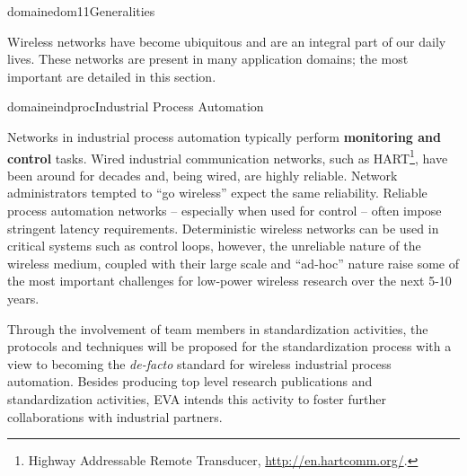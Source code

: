 \documentclass{ra2016}
\begin{document}

\begin{module}{domaine}{dom11}{Generalities}

Wireless networks have become ubiquitous and are an integral part of our daily lives.
These networks are present in many application domains; the most important are detailed in this section.

\end{module}

\begin{module}{domaine}{indproc}{Industrial Process Automation}

Networks in industrial process automation typically perform \textbf{monitoring and control} tasks.
Wired industrial communication networks, such as HART\footnote{Highway Addressable Remote Transducer, \url{http://en.hartcomm.org/}.}, have been around for decades and, being wired, are highly reliable.
Network administrators tempted to ``go wireless'' expect the same reliability.
Reliable process automation networks -- especially when used for control -- often impose stringent latency requirements.
Deterministic wireless networks can be used in critical systems such as control loops, however, the unreliable nature of the wireless medium, coupled with their large scale and ``ad-hoc'' nature raise some of the most important challenges for low-power wireless research over the next 5-10 years.

Through the involvement of team members in standardization activities, the protocols and techniques will be proposed for the standardization process with a view to becoming the \textit{de-facto} standard for wireless industrial process automation.
Besides producing top level research publications and standardization activities, EVA intends this activity to foster further collaborations with industrial partners.

\end{module}
\end{document}

